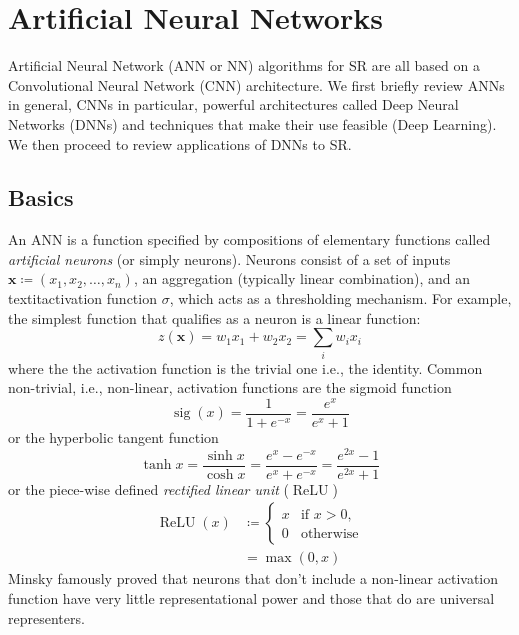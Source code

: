 %
\section{Artificial Neural Networks}\label{sec:neural-networks}
\localtableofcontents
Artificial Neural Network (ANN or NN) algorithms for SR are all based on a Convolutional Neural Network (CNN) architecture.
%
We first briefly review ANNs in general, CNNs in particular, powerful architectures called Deep Neural Networks (DNNs) and techniques that make their use feasible (Deep Learning).
%
We then proceed to review applications of DNNs to SR.
%
\subsection{Basics}

An ANN is a function specified by compositions of elementary functions called \textit{artificial neurons} (or simply neurons).
%
Neurons consist of a set of inputs \(\mathbf{x} \coloneqq (x_1, x_2, \dots, x_n)\), an aggregation (typically linear combination), and an textit{activation function} \(\sigma\), which acts as a thresholding mechanism.
%
For example, the simplest function that qualifies as a neuron is a linear function:
\begin{equation}
    z(\mathbf{x}) = w_1 x_1 + w_2 x_2 = \sum_i w_i x_i
    \label{eqn:simpleann}
\end{equation}
where the the activation function is the trivial one i.e., the identity.
%
Common non-trivial, i.e., non-linear, activation functions are the sigmoid function
\begin{equation}
    \operatorname{sig}(x)={\frac {1}{1+e^{-x}}}={\frac {e^{x}}{e^{x}+1}}
\end{equation}
or the hyperbolic tangent function
\begin{equation}
    \tanh x={\frac {\sinh x}{\cosh x}}={\frac {e^{x}-e^{-x}}{e^{x}+e^{-x}}}={\frac {e^{2x}-1}{e^{2x}+1}}
\end{equation}
or the piece-wise defined \textit{rectified linear unit} (\(\operatorname{ReLU}\))
\begin{align}
    \operatorname{ReLU}(x) & \coloneqq \begin{cases}x&{\text{if }}x>0,\\0&{\text{otherwise}}\end{cases} \\
                           & = \max(0, x)
\end{align}
%
Minsky \etal\cite{minsky2017perceptrons} famously proved that neurons that don't include a non-linear activation function have very little representational power and those that do are universal representers.
